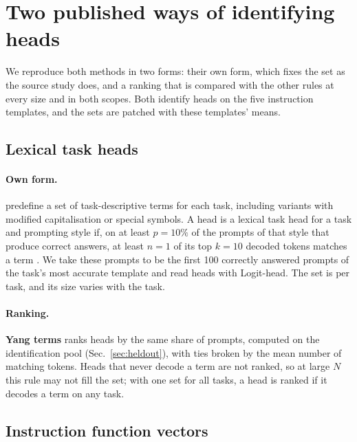 \documentclass[10pt,a4paper]{article}
\begin{document}
\section{Two published ways of identifying heads}\label{sec:published}

We reproduce both methods in two forms: their own form, which fixes the set as the source study does, and a ranking that is compared with the other rules at every size and in both scopes. Both identify heads on the five instruction templates, and the sets are patched with these templates' means.

\subsection{Lexical task heads}\label{sec:yang}

\paragraph{Own form.} \citet[App.~A.2.1]{yang2026shared} predefine a set of task-descriptive terms for each task, including variants with modified capitalisation or special symbols. A head is a lexical task head for a task and prompting style if, on at least $p=10\%$ of the prompts of that style that produce correct answers, at least $n=1$ of its top $k=10$ decoded tokens matches a term \citep[Sec.~2.2.2]{yang2026shared}. We take these prompts to be the first 100 correctly answered prompts of the task's most accurate template and read heads with Logit-head. The set is per task, and its size varies with the task.

\paragraph{Ranking.} \textbf{Yang terms} ranks heads by the same share of prompts, computed on the identification pool (Sec.~\ref{sec:heldout}), with ties broken by the mean number of matching tokens. Heads that never decode a term are not ranked, so at large $N$ this rule may not fill the set; with one set for all tasks, a head is ranked if it decodes a term on any task.

\subsection{Instruction function vectors}\label{sec:davidson}
\end{document}
